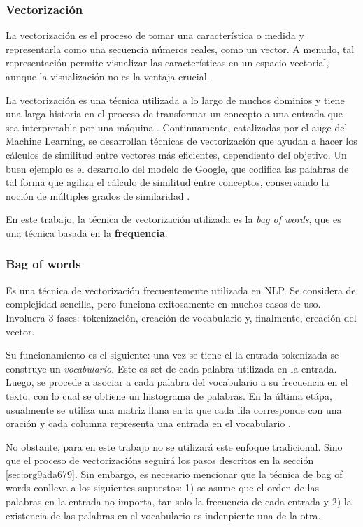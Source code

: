 \documentclass[12pt,letterpaper,twoside]{article}
\begin{document}
\subsubsection{Vectorización}
\label{sec:org88b1961}
La vectorización es el proceso de tomar una característica o medida
y representarla como una secuencia números reales, como un vector. A menudo,
tal representación permite visualizar las características en un espacio
vectorial, aunque la visualización no es la ventaja crucial.

La vectorización es una técnica utilizada a lo largo de muchos
dominios y tiene una larga historia en el proceso de transformar
un concepto a una entrada que sea interpretable por una máquina
\cite{jha_abhishek_vectorization}.  Continuamente, catalizadas por
el auge del Machine Learning, se desarrollan técnicas de
vectorización que ayudan a hacer los cálculos de similitud entre
vectores más eficientes, dependiento del objetivo. Un buen
ejemplo es el desarrollo del modelo de Google, que
codifica las palabras de tal forma que agiliza el cálculo
de similitud entre conceptos, conservando la noción
de múltiples grados de similaridad \cite{mikolov2013efficient}.

En este trabajo, la técnica de vectorización utilizada es
la \emph{bag of words}, que es una técnica basada en la \textbf{frequencia}.

\subsubsection{Bag of words}
\label{sec:orgb85e4ed}

Es una técnica de vectorización frecuentemente utilizada en NLP.
Se considera de complejidad sencilla, pero funciona exitosamente
en muchos casos de uso. Involucra 3 fases: tokenización, creación de vocabulario y,
finalmente, creación del vector.

Su funcionamiento es el siguiente: una vez se tiene el la entrada
tokenizada se construye un \emph{vocabulario}.  Este es set de cada
palabra utilizada en la entrada.  Luego, se procede a asociar a
cada palabra del vocabulario a su frecuencia en el texto, con lo
cual se obtiene un histograma de palabras. En la última etápa,
usualmente se utiliza una matriz llana en la que cada fila
corresponde con una oración y cada columna representa una entrada
en el vocabulario \cite{jha_abhishek_vectorization}.

No obstante, para en este trabajo no se utilizará este enfoque
tradicional.  Sino que el proceso de vectorizacións seguirá los
pasos descritos en la sección \ref{sec:org9ada679}. Sin embargo,
es necesario mencionar que la técnica de bag of words conlleva
a los siguientes supuestos: 1) se asume que el orden de las
palabras en la entrada no importa, tan solo la frecuencia
de cada entrada y 2) la existencia de las palabras en el
vocabulario es indenpiente una de la otra.  
\end{document}
